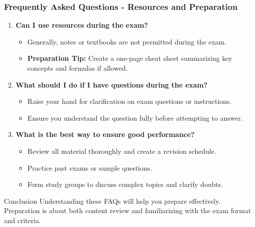\documentclass[aspectratio=169]{beamer}
\begin{document}
\begin{frame}[fragile]
    \frametitle{Frequently Asked Questions - Resources and Preparation}
    \begin{enumerate}
        \item \textbf{Can I use resources during the exam?}
        \begin{itemize}
            \item Generally, notes or textbooks are not permitted during the exam.
            \item \textbf{Preparation Tip:} Create a one-page cheat sheet summarizing key concepts and formulas if allowed.
        \end{itemize}
        
        \item \textbf{What should I do if I have questions during the exam?}
        \begin{itemize}
            \item Raise your hand for clarification on exam questions or instructions.
            \item Ensure you understand the question fully before attempting to answer.
        \end{itemize}
        
        \item \textbf{What is the best way to ensure good performance?}
        \begin{itemize}
            \item Review all material thoroughly and create a revision schedule.
            \item Practice past exams or sample questions.
            \item Form study groups to discuss complex topics and clarify doubts.
        \end{itemize}
    \end{enumerate}
    
    \begin{block}{Conclusion}
        Understanding these FAQs will help you prepare effectively. Preparation is about both content review and familiarizing with the exam format and criteria.
    \end{block}
\end{frame}
\end{document}
